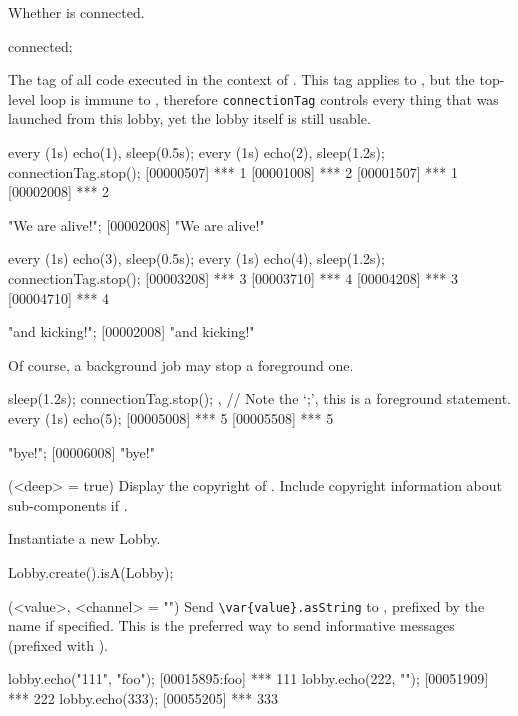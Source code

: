 \begin{urbiscriptapi}
\item[connected]
  Whether \this is connected.
\begin{urbiassert}
connected;
\end{urbiassert}


\item[connectionTag] The tag of all code executed in the context of \this.
  This tag applies to \this, but the top-level loop is immune to
  , therefore \lstinline|connectionTag| controls every
  thing that was launched from this lobby, yet the lobby itself is still
  usable.
\begin{urbiscript}
every (1s) echo(1), sleep(0.5s); every (1s) echo(2),
sleep(1.2s);
connectionTag.stop();
[00000507] *** 1
[00001008] *** 2
[00001507] *** 1
[00002008] *** 2

"We are alive!";
[00002008] "We are alive!"

every (1s) echo(3), sleep(0.5s); every (1s) echo(4),
sleep(1.2s);
connectionTag.stop();
[00003208] *** 3
[00003710] *** 4
[00004208] *** 3
[00004710] *** 4

"and kicking!";
[00002008] "and kicking!"
\end{urbiscript}

  Of course, a background job may stop a foreground one.
\begin{urbiscript}
{ sleep(1.2s); connectionTag.stop(); },
// Note the `;', this is a foreground statement.
every (1s) echo(5);
[00005008] *** 5
[00005508] *** 5

"bye!";
[00006008] "bye!"
\end{urbiscript}


\item[copyright](<deep> = true)%
  Display the copyright of \usdk.  Include copyright information
  about sub-components if .

\item[create]
  Instantiate a new Lobby.
\begin{urbiassert}
Lobby.create().isA(Lobby);
\end{urbiassert}


\item[echo](<value>, <channel> = "")%
  Send \lstinline|\var{value}.asString| to \this, prefixed
  by the   name if specified.  This is
  the preferred way to send informative messages (prefixed with
  \samp{***}).
\begin{urbiscript}
lobby.echo("111", "foo");
[00015895:foo] *** 111
lobby.echo(222, "");
[00051909] *** 222
lobby.echo(333);
[00055205] *** 333
\end{urbiscript}



\end{urbiscriptapi}
